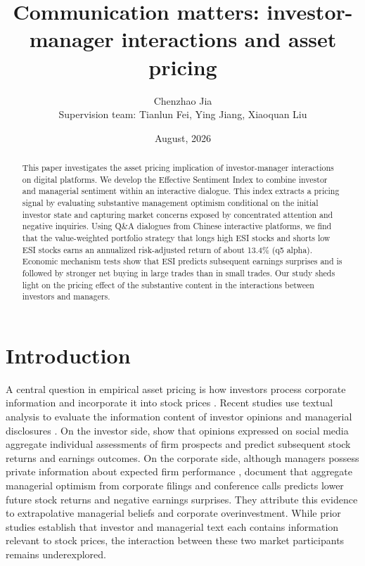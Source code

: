 \documentclass[12pt]{article}
\date{August, 2026}
\title{Communication matters: investor-manager interactions and asset pricing}
\author{
Chenzhao Jia\\[0.3em]
\small Supervision team: Tianlun Fei, Ying Jiang, Xiaoquan Liu}
\begin{document}
\maketitle
\begin{abstract}
This paper investigates the asset pricing implication of investor-manager interactions on digital platforms. We develop the Effective Sentiment Index to combine investor and managerial sentiment within an interactive dialogue. This index extracts a pricing signal by evaluating substantive management optimism conditional on the initial investor state and capturing market concerns exposed by concentrated attention and negative inquiries. Using Q\&A dialogues from Chinese interactive platforms, we find that the value-weighted portfolio strategy that longs high ESI stocks and shorts low ESI stocks earns an annualized risk-adjusted return of about 13.4\% (q5 alpha). Economic mechanism tests show that ESI predicts subsequent earnings surprises and is followed by stronger net buying in large trades than in small trades. Our study sheds light on the pricing effect of the substantive content in the interactions between investors and managers.
\end{abstract}


\section{Introduction}\label{sec:introduction}

A central question in empirical asset pricing is how investors process corporate information and incorporate it into stock prices \citep{blankespoor2020}. Recent studies use textual analysis to evaluate the information content of investor opinions and managerial disclosures \citep{bartov2018,chen2014,cookson2024,jiang2019}. On the investor side, \citet{chen2014} show that opinions expressed on social media aggregate individual assessments of firm prospects and predict subsequent stock returns and earnings outcomes. On the corporate side, although managers possess private information about expected firm performance \citep{beyer2010financial,healy2001information}, \citet{jiang2019} document that aggregate managerial optimism from corporate filings and conference calls predicts lower future stock returns and negative earnings surprises. They attribute this evidence to extrapolative managerial beliefs and corporate overinvestment. While prior studies establish that investor and managerial text each contains information relevant to stock prices, the interaction between these two market participants remains underexplored.
\end{document}
